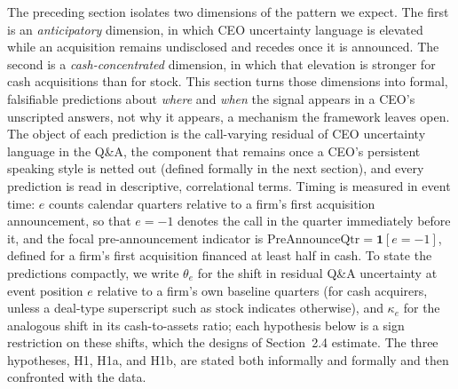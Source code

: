 
The preceding section isolates two dimensions of the pattern we expect. The first is an \emph{anticipatory} dimension, in which CEO uncertainty language is elevated while an acquisition remains undisclosed and recedes once it is announced. The second is a \emph{cash-concentrated} dimension, in which that elevation is stronger for cash acquisitions than for stock. This section turns those dimensions into formal, falsifiable predictions about \emph{where} and \emph{when} the signal appears in a CEO's unscripted answers, not why it appears, a mechanism the framework leaves open. The object of each prediction is the call-varying residual of CEO uncertainty language in the Q\&A, the component that remains once a CEO's persistent speaking style is netted out (defined formally in the next section), and every prediction is read in descriptive, correlational terms. Timing is measured in event time: $e$ counts calendar quarters relative to a firm's first acquisition announcement, so that $e=-1$ denotes the call in the quarter immediately before it, and the focal pre-announcement indicator is $\mathrm{PreAnnounceQtr}=\mathbf{1}[e=-1]$, defined for a firm's first acquisition financed at least half in cash. To state the predictions compactly, we write $\theta_e$ for the shift in residual Q\&A uncertainty at event position $e$ relative to a firm's own baseline quarters (for cash acquirers, unless a deal-type superscript such as $\mathrm{stock}$ indicates otherwise), and $\kappa_e$ for the analogous shift in its cash-to-assets ratio; each hypothesis below is a sign restriction on these shifts, which the designs of Section~2.4 estimate. The three hypotheses, H1, H1a, and H1b, are stated both informally and formally and then confronted with the data.

